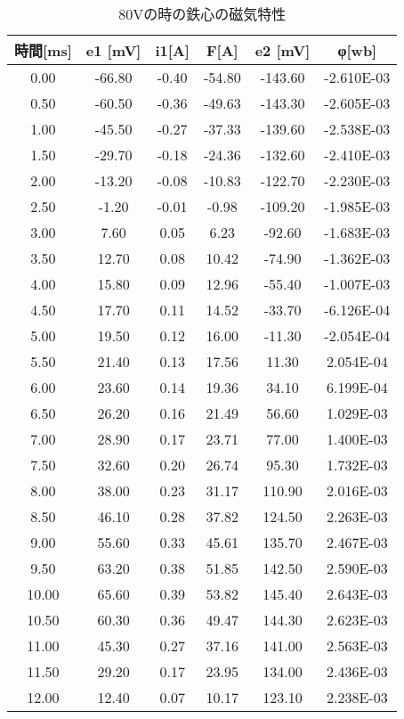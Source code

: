 \documentclass[11pt,a4j]{jsarticle}
\begin{document}
 \begin{table}[htb]
  \begin{center}
    \caption{80Vの時の鉄心の磁気特性}
    \begin{tabular}{cccccc} \toprule
時間[ms]	&	e1 [mV]	&	i1[A]	&	F[A]	&	e2 [mV]	&	φ[wb]	\\ \midrule
0.00	&	-66.80	&	-0.40	&	-54.80		&	-143.60	&	-2.610E-03	\\
0.50	&	-60.50	&	-0.36	&	-49.63		&	-143.30	&	-2.605E-03	\\
1.00	&	-45.50	&	-0.27	&	-37.33		&	-139.60	&	-2.538E-03	\\
1.50	&	-29.70	&	-0.18	&	-24.36		&	-132.60	&	-2.410E-03	\\
2.00	&	-13.20	&	-0.08	&	-10.83		&	-122.70	&	-2.230E-03	\\
2.50	&	-1.20	&	-0.01	&	-0.98		&	-109.20	&	-1.985E-03	\\
3.00	&	7.60	&	0.05	&	6.23		&	-92.60	&	-1.683E-03	\\
3.50	&	12.70	&	0.08	&	10.42		&	-74.90	&	-1.362E-03	\\
4.00	&	15.80	&	0.09	&	12.96		&	-55.40	&	-1.007E-03	\\
4.50	&	17.70	&	0.11	&	14.52		&	-33.70	&	-6.126E-04	\\
5.00	&	19.50	&	0.12	&	16.00		&	-11.30	&	-2.054E-04	\\
5.50	&	21.40	&	0.13	&	17.56		&	11.30	&	2.054E-04	\\
6.00	&	23.60	&	0.14	&	19.36		&	34.10	&	6.199E-04	\\
6.50	&	26.20	&	0.16	&	21.49		&	56.60	&	1.029E-03	\\
7.00	&	28.90	&	0.17	&	23.71		&	77.00	&	1.400E-03	\\
7.50	&	32.60	&	0.20	&	26.74		&	95.30	&	1.732E-03	\\
8.00	&	38.00	&	0.23	&	31.17		&	110.90	&	2.016E-03	\\
8.50	&	46.10	&	0.28	&	37.82		&	124.50	&	2.263E-03	\\
9.00	&	55.60	&	0.33	&	45.61		&	135.70	&	2.467E-03	\\
9.50	&	63.20	&	0.38	&	51.85		&	142.50	&	2.590E-03	\\
10.00	&	65.60	&	0.39	&	53.82		&	145.40	&	2.643E-03	\\
10.50	&	60.30	&	0.36	&	49.47		&	144.30	&	2.623E-03	\\
11.00	&	45.30	&	0.27	&	37.16		&	141.00	&	2.563E-03	\\
11.50	&	29.20	&	0.17	&	23.95		&	134.00	&	2.436E-03	\\
12.00	&	12.40	&	0.07	&	10.17		&	123.10	&	2.238E-03	\\

\end{tabular}
\end{center}
\end{table}
\end{document}
